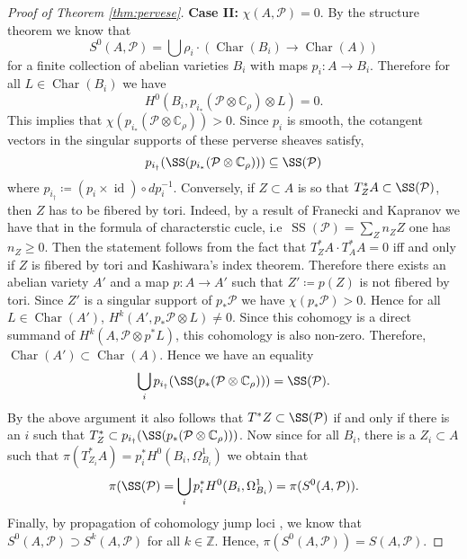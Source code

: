 \documentclass[11pt,reqno]{amsart}
\theoremstyle{definition}
\theoremstyle{remark}
\theoremstyle{cited}
\theoremstyle{citeddef}
\DeclareMathOperator{\id}{id}                    %
\DeclareMathOperator{\Char}{Char}
\DeclareMathOperator{\CC}{SS}
\newcommand{\sP}{\mathcal{P}}
\newcommand{\bbC}{\mathbb{C}}
\newcommand{\bbZ}{\mathbb{Z}}
\begin{document}
\begin{proof}[Proof of Theorem \ref{thm:pervese}]
\noindent \textbf{Case II: } $\chi(A, \sP)=0$. 
By the structure theorem \cite[Theorem 7.3]{sch}
we know that 
\[S^0(A, \sP) = \bigcup \rho_i\cdot(\Char(B_i) \to \Char(A))\]
for a finite collection of abelian varieties $B_i$
with maps $p_i\colon A\to B_i$. 
Therefore for all $L\in\Char(B_i)$ we have
\[H^0(B_i, p_{i_*}(\sP\otimes \bbC_{\rho})\otimes L) = 0.\]
This implies that $\chi(p_{i_*}(\sP\otimes \bbC_{\rho}))>0$. 
Since $p_i$ is smooth, the cotangent vectors in the singular supports of these perverse sheaves satisfy,
\[p_{i_{\dagger}}(\SS(p_{i_*}(\sP\otimes \bbC_{\rho}))) \subseteq \SS(\sP)\]
where $p_{i_{\dagger}} \coloneqq (p_i\times \id)\circ dp_i^{-1}$.  
Conversely, if $Z\subset A$ is so that 
$T^*_ZA \subset \SS(\sP)$, then
$Z$ has to be fibered by tori. Indeed, by a result of
Franecki and Kapranov
\cite[Corollary 1.4]{FK} we have that in the formula of
characterstic cucle, i.e\ $\CC(\sP) = \sum_Z n_Z Z$
one has $n_Z\geq 0$. Then the statement follows from the
fact that $T^*_ZA\cdot T^*_AA = 0$ iff and only if $Z$ is fibered by tori and Kashiwara's index theorem. 
Therefore there exists an abelian variety $A'$ and a map
$p\colon A\to A'$ such that $Z' \coloneqq p(Z)$ is 
not fibered by tori. Since $Z'$
is a singular support of $p_*\sP$
we have $\chi(p_*\sP) > 0$. Hence for all
$L\in \Char(A')$, $H^k(A', p_*\sP\otimes L) \neq 0$. Since
this cohomogy is a direct summand of $H^k(A, \sP\otimes p^*L)$,
this cohomology is also non-zero. Therefore,
$\Char(A') \subset \Char(A)$. Hence we have an
equality
\[\bigcup_i p_{i_{\dagger}}(\SS(p_*(\sP\otimes \bbC_{\rho}))) = \SS(\sP).\]
By the above argument it also follows that
$T^*Z\subset \SS(\sP)$ if and only if there is an $i$
such that
$T^*_Z \subset p_{i_{\dagger}}(\SS(p_*(\sP\otimes \bbC_{\rho})))$.
Now since for all $B_i$, there is a $Z_i\subset A$
such that $\pi(T^*_{Z_i}A) = p_i^*H^0(B_i, \Omega_{B_i}^1)$
we obtain
that
\[\pi(\SS(\sP) = \bigcup_ip_i^*H^0(B_i, \Omega_{B_i}^1)
= \pi(S^0(A, \sP)).\]
Finally, by propagation of cohomology jump loci 
\cite{??}, we know that $S^0(A, \sP)\supset S^k(A,\sP)$
for all $k\in \bbZ$. Hence,
$\pi(S^0(A, \sP)) = S(A, \sP)$.




\end{proof}
\end{document}
